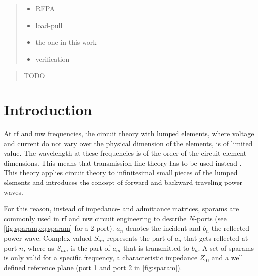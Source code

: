 \documentclass[12pt,a4paper,parskip=full,abstract=true,BCOR=10mm,twoside,open=right]{scrreprt}
\begin{document}
\begin{otherlanguage}{ngerman}
\begin{abstract}
    \begin{itemize}
        \item RFPA
        \item load-pull
        \item the one in this work
        \item verification
    \end{itemize}
\end{abstract}
\end{otherlanguage}

\renewcommand{\abstractname}{Acknowledgements}
\begin{abstract}
    TODO
\end{abstract}

\tableofcontents

\chapter{Introduction}
\label{chap:introduction}

At \gls{rf} and \gls{mw} frequencies, the circuit theory with lumped elements, where
voltage and current do not vary over the physical dimension of the elements, is of limited
value. The wavelength at these frequencies is of the order of the circuit
element dimensions. This means that transmission line theory has to be used instead \cite{pozar_mw_engineering_2011}.
This theory applies circuit theory to infinitesimal small pieces of the lumped elements
and introduces the concept of forward and backward traveling power waves.

For this reason, instead of impedance- and admittance matrices, \glspl{sparam}
are commonly used in \gls{rf} and \gls{mw} circuit engineering to describe
$N$-ports (see \cref{fig:sparam,eq:sparam} for a 2-port). $a_n$ denotes the incident and
$b_n$ the reflected power wave. Complex valued $S_{nn}$ represents the
part of $a_n$ that gets reflected at port $n$, where as $S_{nm}$ is the part of $a_m$ that
is transmitted to $b_n$. A set of \glspl{sparam} is only valid for a specific frequency, a
characteristic impedance $Z_0$, and a well defined reference plane (port 1 and port 2 in \cref{fig:sparam}).
\end{document}
